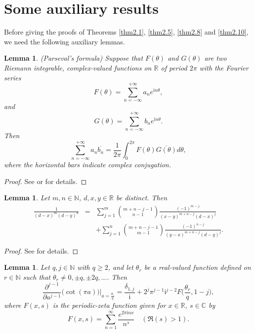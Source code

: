 \documentclass[reqno]{amsart}
\numberwithin{equation}{section}
\newtheorem{lemma}[thm]{Lemma}
\begin{document}
\section{Some auxiliary results}

Before giving the proofs of Theorems \ref{thm2.1}, \ref{thm2.5}, \ref{thm2.8} and \ref{thm2.10}, we need the following auxiliary lemmas.

\begin{lemma}\label{lem3.1} (Parseval's formula) Suppose that $F(\theta)$ and $G(\theta)$ are two Riemann integrable, complex-valued functions on $\mathbb{R}$ of period $2\pi$ with the Fourier series
\begin{equation*}
F(\theta)=\sum_{n=-\infty}^{+\infty}a_{n}e^{\mathrm{i}n\theta},
\end{equation*}
and
\begin{equation*}
G(\theta)=\sum_{n=-\infty}^{+\infty}b_{n}e^{\mathrm{i}n\theta}.
\end{equation*}
Then
\begin{equation}\label{eq3.1}
\sum_{n=-\infty}^{+\infty}a_{n}\overline{b_{n}}=\frac{1}{2\pi}\int_{0}^{2\pi}F(\theta)\overline{G(\theta)}d\theta,
\end{equation}
where the horizontal bars indicate complex conjugation.
\end{lemma}

\begin{proof}
See \cite[Proposition 3.1.10]{cohen} or \cite[p. 81]{stein} for details.
\end{proof}

\begin{lemma}\label{lem3.2} Let $m,n\in\mathbb{N}$, $d,x,y\in\mathbb{R}$ be distinct. Then
\begin{eqnarray}\label{eq3.2}
\frac{1}{(d-x)^{m}(d-y)^{n}}&=&\sum_{j=1}^{m}\binom{m+n-j-1}{n-1}\frac{(-1)^{m-j}}{(x-y)^{m+n-j}(d-x)^{j}}\nonumber\\
&&+\sum_{j=1}^{n}\binom{m+n-j-1}{m-1}\frac{(-1)^{n-j}}{(y-x)^{m+n-j}(d-y)^{j}}.
\end{eqnarray}
\end{lemma}

\begin{proof}
See \cite[Lemma 2.2]{he2} for details.
\end{proof}

\begin{lemma}\label{lem3.3} Let $q,j\in\mathbb{N}$ with $q\geq2$, and let $\theta_{r}$ be a real-valued function defined on $r\in\mathbb{N}$ such that $\theta_{r}\not=0,\pm q,\pm 2q,\ldots$. Then
\begin{equation}\label{eq3.3}
\frac{\partial^{j-1}}{\partial a^{j-1}}\bigl(\cot(\pi a)\bigl)\biggl|_{a=\frac{\theta_{r}}{q}}=\frac{\delta_{1,j}}{\mathrm{i}}+2^{j}\pi^{j-1}\mathrm{i}^{j-2}F\biggl(\frac{\theta_{r}}{q},1-j\biggl),
\end{equation}
where $F(x,s)$ is the periodic-zeta function given for $x\in\mathbb{R}$, $s\in\mathbb{C}$ by
\begin{equation*}
F(x,s)=\sum_{n=1}^{\infty}\frac{e^{2\pi \mathrm{i}nx}}{n^{s}}\quad(\Re(s)>1).
\end{equation*}
\end{lemma}
\end{document}
